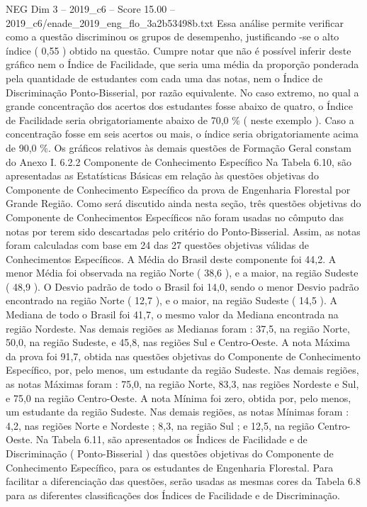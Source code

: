 \begin{textsample}{NEG Dim 3 – 2019\_c6 – Score 15.00 – 2019\_c6/enade\_2019\_eng\_flo\_3a2b53498b.txt}
Essa análise permite verificar como a questão discriminou os grupos de desempenho, justificando -se o alto índice ( 0,55 ) obtido na questão.
Cumpre notar que não é possível inferir deste gráfico nem o Índice de Facilidade, que seria uma média da proporção ponderada pela quantidade de estudantes com cada uma das notas, nem o Índice de Discriminação Ponto-Bisserial, por razão equivalente.
No caso extremo, no qual a grande concentração dos acertos dos estudantes fosse abaixo de quatro, o Índice de Facilidade seria obrigatoriamente abaixo de 70,0 \% ( neste exemplo ).
Caso a concentração fosse em seis acertos ou mais, o índice seria obrigatoriamente acima de 90,0 \%.
Os gráficos relativos às demais questões de Formação Geral constam do Anexo I. 6.2.2 Componente de Conhecimento Específico Na Tabela 6.10, são apresentadas as Estatísticas Básicas em relação às questões objetivas do Componente de Conhecimento Específico da prova de Engenharia Florestal por Grande Região.
Como será discutido ainda nesta seção, três questões objetivas do Componente de Conhecimentos Específicos não foram usadas no cômputo das notas por terem sido descartadas pelo critério do Ponto-Bisserial.
Assim, as notas foram calculadas com base em 24 das 27 questões objetivas válidas de Conhecimentos Específicos.
A Média do Brasil deste componente foi 44,2.
A menor Média foi observada na região Norte ( 38,6 ), e a maior, na região Sudeste ( 48,9 ).
O Desvio padrão de todo o Brasil foi 14,0, sendo o menor Desvio padrão encontrado na região Norte ( 12,7 ), e o maior, na região Sudeste ( 14,5 ).
A Mediana de todo o Brasil foi 41,7, o mesmo valor da Mediana encontrada na região Nordeste.
Nas demais regiões as Medianas foram : 37,5, na região Norte, 50,0, na região Sudeste, e 45,8, nas regiões Sul e Centro-Oeste.
A nota Máxima da prova foi 91,7, obtida nas questões objetivas do Componente de Conhecimento Específico, por, pelo menos, um estudante da região Sudeste.
Nas demais regiões, as notas Máximas foram : 75,0, na região Norte, 83,3, nas regiões Nordeste e Sul, e 75,0 na região Centro-Oeste.
A nota Mínima foi zero, obtida por, pelo menos, um estudante da região Sudeste.
Nas demais regiões, as notas Mínimas foram : 4,2, nas regiões Norte e Nordeste ; 8,3, na região Sul ; e 12,5, na região Centro-Oeste.
Na Tabela 6.11, são apresentados os Índices de Facilidade e de Discriminação ( Ponto-Bisserial ) das questões objetivas do Componente de Conhecimento Específico, para os estudantes de Engenharia Florestal.
Para facilitar a diferenciação das questões, serão usadas as mesmas cores da Tabela 6.8 para as diferentes classificações dos Índices de Facilidade e de Discriminação.

\end{textsample}
